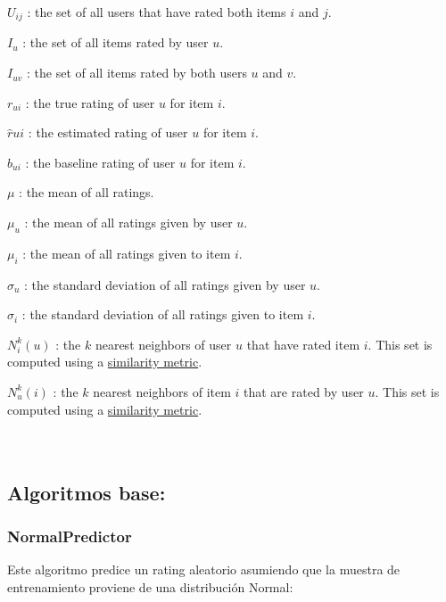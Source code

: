 \documentclass{article}
\begin{document}
$U_{ij}$ : the set of all users that have rated both items $i$ and $j$.

$I_u$ : the set of all items rated by user $u$.

$I_{uv}$ : the set of all items rated by both users $u$ and $v$.

$r_{ui}$ : the true rating of user $u$ for item $i$.

$\hat{r}{ui}$ : the estimated rating of user $u$ for item $i$.

$b_{ui}$ : the baseline rating of user $u$ for item $i$.

$\mu$ : the mean of all ratings.

$\mu_u$ : the mean of all ratings given by user $u$.

$\mu_i$ : the mean of all ratings given to item $i$.

$\sigma_u$ : the standard deviation of all ratings given by user $u$.

$\sigma_i$ : the standard deviation of all ratings given to item $i$.

$N_i^k(u)$ : the $k$ nearest neighbors of user $u$ that have rated item $i$. This set is computed using a \href{https://surprise.readthedocs.io/en/stable/similarities.html#module-surprise.similarities}{similarity metric}.

$N_u^k(i)$ : the $k$ nearest neighbors of item $i$ that are rated by user $u$. This set is computed using a \href{https://surprise.readthedocs.io/en/stable/similarities.html#module-surprise.similarities}{similarity metric}.\\
\\

\\

\subsection{Algoritmos base:}

\subsubsection{NormalPredictor}

Este algoritmo predice un rating aleatorio asumiendo que la muestra de entrenamiento proviene de una distribución Normal:
\end{document}
